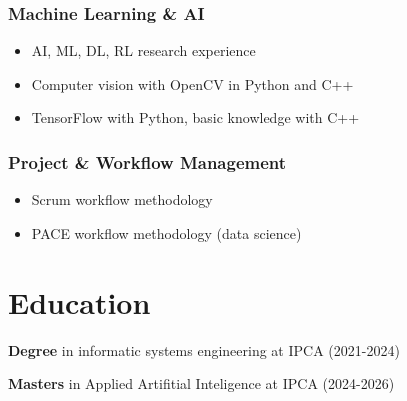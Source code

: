 \documentclass[a4paper,9pt]{article}
\newcommand{\coloritem}[2]{
    \item[{\color{#1}$\bullet$}] #2
}
\begin{document}
\begin{tcolorbox}
{{\vspace{-3.2mm}
\subsubsection*{Machine Learning \& AI}
\vspace{-1.2mm}
\begin{itemize}
    \coloritem{blue}{AI, ML, DL, RL research experience}
    \coloritem{blue}{Computer vision with OpenCV in Python and C++}
    \coloritem{blue}{TensorFlow with Python, basic knowledge with C++}
\end{itemize}


\vspace{-3.2mm}
\subsubsection*{Project \& Workflow Management}
\vspace{-1.2mm}
\begin{itemize}
    \coloritem{blue}{Scrum workflow methodology}
    \coloritem{blue}{PACE workflow methodology (data science)}
\end{itemize}

\vspace{-3.2mm}
\section*{Education}

{\color{blue} \textbf {Degree}}  in informatic systems engineering at IPCA (2021-2024)


{\color{blue} \textbf {Masters}} in Applied Artifitial Inteligence at IPCA (2024-2026)

}}
\end{tcolorbox}
\end{document}
